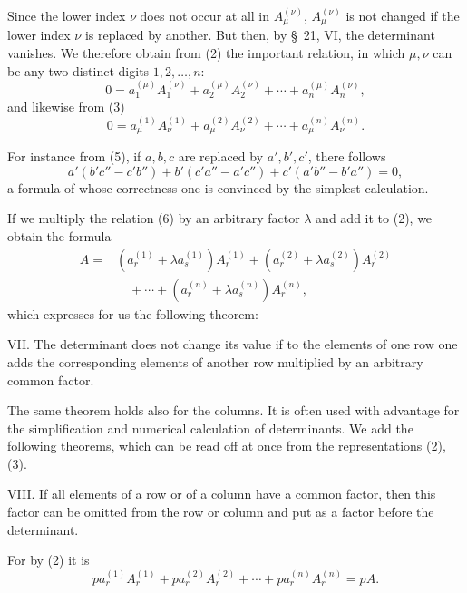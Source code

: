 \documentclass[11pt]{article}
\begin{document}
Since the lower index \(\nu\) does not occur at all in \(A_\mu^{(\nu)}\), \(A_\mu^{(\nu)}\) is not changed if the lower index \(\nu\) is replaced by another. But then, by \S~21, VI, the determinant vanishes. We therefore obtain from (2) the important relation, in which \(\mu,\nu\) can be any two distinct digits \(1,2,\ldots,n\):
\begin{equation}
0=a_1^{(\mu)}A_1^{(\nu)}+a_2^{(\mu)}A_2^{(\nu)}
 +\cdots+a_n^{(\mu)}A_n^{(\nu)},
\tag{6}
\end{equation}
and likewise from (3)
\begin{equation}
0=a_\mu^{(1)}A_\nu^{(1)}+a_\mu^{(2)}A_\nu^{(2)}
 +\cdots+a_\mu^{(n)}A_\nu^{(n)}.
\tag{7}
\end{equation}

For instance from (5), if \(a,b,c\) are replaced by \(a',b',c'\), there follows
\begin{equation}
 a'(b'c''-c'b'')+b'(c'a''-a'c'')+c'(a'b''-b'a'')=0,
\tag{8}
\end{equation}
a formula of whose correctness one is convinced by the simplest calculation.

If we multiply the relation (6) by an arbitrary factor \(\lambda\) and add it to (2), we obtain the formula
\begin{equation}
\begin{aligned}
 A={}&(a_r^{(1)}+\lambda a_s^{(1)})A_r^{(1)}
 +(a_r^{(2)}+\lambda a_s^{(2)})A_r^{(2)}\\
&\quad+\cdots+(a_r^{(n)}+\lambda a_s^{(n)})A_r^{(n)},
\end{aligned}
\tag{9}
\end{equation}
which expresses for us the following theorem:

VII. The determinant does not change its value if to the elements of one row one adds the corresponding elements of another row multiplied by an arbitrary common factor.

The same theorem holds also for the columns. It is often used with advantage for the simplification and numerical calculation of determinants. We add the following theorems, which can be read off at once from the representations (2), (3).

VIII. If all elements of a row or of a column have a common factor, then this factor can be omitted from the row or column and put as a factor before the determinant.

For by (2) it is
\[
 p a_r^{(1)}A_r^{(1)}+p a_r^{(2)}A_r^{(2)}+\cdots+p a_r^{(n)}A_r^{(n)}=pA.
\]
\end{document}
